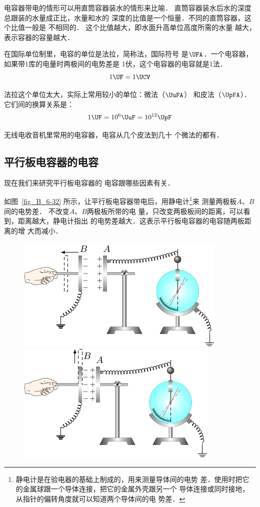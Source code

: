 电容器带电的情形可以用直筒容器装水的情形来比喻．
直筒容器装水后水的深度总跟装的水量成正比，水量和水的
深度的比值是一个恒量．不同的直筒容器，这个比值一般是
不相同的．
这个比值越大，即水面升高单位高度所需的水量
越大，表示容器的容量越大．

在国际单位制里，电容的单位是法拉，简称法，国际符号
是$\UFA$．一个电容器，如果带1库的电量时两极间的电势差是
1伏，这个电容器的电容就是1法．
\[1 \UF=1\UCV \]

法拉这个单位太大，实际上常用较小的单位：微法（$\UuFA$）
和皮法（$\UpFA$）．它们间的换算关系是：
\[1 \UF=10^6\UuF=10^{12} \UpF \]

无线电收音机里常用的电容器，电容从几个皮法到几十
个微法的都有．

\subsection{平行板电容器的电容}


现在我们来研究平行板电容器的
电容跟哪些因素有关．

如图~\ref{fig_B_6-32} 所示，让平行板电容器带电后，用静电计\footnote{静电计是在验电器的基础上制成的，用来测量导体间的电势
差．使用时把它的金属球跟一个导体连接，把它的金属外壳跟另一个
导体连接或同时接地，从指针的偏转角度就可以知道两个导体间的电
势差．}来
测量两极板$A$、$B$间的电势差．
不改变$A$、$B$两极板所带的电
量，只改变两极板间的距离，可以看到，距离越大，静电计指出
的电势差越大．这表示平行板电容器的电容随两板距离的增
大而减小．

\begin{figure}[htbp]
    \centering
    \begin{minipage}[t]{0.48\textwidth}
        \centering
        \includegraphics{fig/B/6-32.pdf}
        \caption{}\label{fig_B_6-32}
    \end{minipage}
    \begin{minipage}[t]{0.48\textwidth}
        \centering
        \includegraphics{fig/B/6-33.pdf}
        \caption{}\label{fig_B_6-33}
    \end{minipage}
\end{figure}

